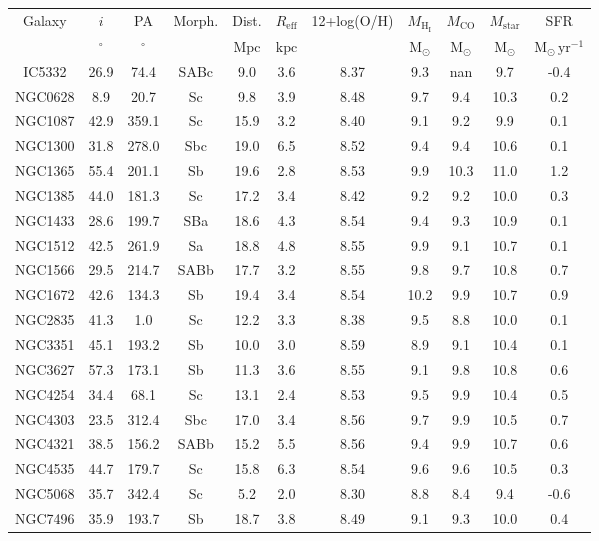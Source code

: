 \begin{table}
\begin{tabular}{ccccccccccc}
Galaxy & $i$ & PA & Morph. & Dist. & $R_\mathrm{eff}$ & 12+log(O/H) & $M_\mathrm{H_I}$ & $M_\mathrm{CO}$ & $M_\mathrm{star}$ & SFR \\
 & $\mathrm{{}^{\circ}}$ & $\mathrm{{}^{\circ}}$ &  & $\mathrm{Mpc}$ & $\mathrm{kpc}$ & $\mathrm{}$ & $\mathrm{M_{\odot}}$ & $\mathrm{M_{\odot}}$ & $\mathrm{M_{\odot}}$ & $\mathrm{M_{\odot}\,yr^{-1}}$ \\
IC5332 & 26.9 & 74.4 & SABc & 9.0 & 3.6 & 8.37 & 9.3 & nan & 9.7 & -0.4 \\
NGC0628 & 8.9 & 20.7 & Sc & 9.8 & 3.9 & 8.48 & 9.7 & 9.4 & 10.3 & 0.2 \\
NGC1087 & 42.9 & 359.1 & Sc & 15.9 & 3.2 & 8.40 & 9.1 & 9.2 & 9.9 & 0.1 \\
NGC1300 & 31.8 & 278.0 & Sbc & 19.0 & 6.5 & 8.52 & 9.4 & 9.4 & 10.6 & 0.1 \\
NGC1365 & 55.4 & 201.1 & Sb & 19.6 & 2.8 & 8.53 & 9.9 & 10.3 & 11.0 & 1.2 \\
NGC1385 & 44.0 & 181.3 & Sc & 17.2 & 3.4 & 8.42 & 9.2 & 9.2 & 10.0 & 0.3 \\
NGC1433 & 28.6 & 199.7 & SBa & 18.6 & 4.3 & 8.54 & 9.4 & 9.3 & 10.9 & 0.1 \\
NGC1512 & 42.5 & 261.9 & Sa & 18.8 & 4.8 & 8.55 & 9.9 & 9.1 & 10.7 & 0.1 \\
NGC1566 & 29.5 & 214.7 & SABb & 17.7 & 3.2 & 8.55 & 9.8 & 9.7 & 10.8 & 0.7 \\
NGC1672 & 42.6 & 134.3 & Sb & 19.4 & 3.4 & 8.54 & 10.2 & 9.9 & 10.7 & 0.9 \\
NGC2835 & 41.3 & 1.0 & Sc & 12.2 & 3.3 & 8.38 & 9.5 & 8.8 & 10.0 & 0.1 \\
NGC3351 & 45.1 & 193.2 & Sb & 10.0 & 3.0 & 8.59 & 8.9 & 9.1 & 10.4 & 0.1 \\
NGC3627 & 57.3 & 173.1 & Sb & 11.3 & 3.6 & 8.55 & 9.1 & 9.8 & 10.8 & 0.6 \\
NGC4254 & 34.4 & 68.1 & Sc & 13.1 & 2.4 & 8.53 & 9.5 & 9.9 & 10.4 & 0.5 \\
NGC4303 & 23.5 & 312.4 & Sbc & 17.0 & 3.4 & 8.56 & 9.7 & 9.9 & 10.5 & 0.7 \\
NGC4321 & 38.5 & 156.2 & SABb & 15.2 & 5.5 & 8.56 & 9.4 & 9.9 & 10.7 & 0.6 \\
NGC4535 & 44.7 & 179.7 & Sc & 15.8 & 6.3 & 8.54 & 9.6 & 9.6 & 10.5 & 0.3 \\
NGC5068 & 35.7 & 342.4 & Sc & 5.2 & 2.0 & 8.30 & 8.8 & 8.4 & 9.4 & -0.6 \\
NGC7496 & 35.9 & 193.7 & Sb & 18.7 & 3.8 & 8.49 & 9.1 & 9.3 & 10.0 & 0.4 \\
\end{tabular}
\end{table}
